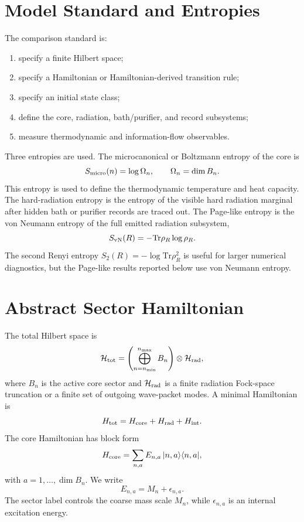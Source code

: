 \documentclass[aps,prd,onecolumn,longbibliography,nofootinbib]{revtex4-2}
\newcommand{\Tr}{\mathrm{Tr}}
\newcommand{\Htot}{\mathcal{H}_{\rm tot}}
\newcommand{\Hrad}{\mathcal{H}_{\rm rad}}
\newcommand{\Svn}{S_{\rm vN}}
\newcommand{\Smicro}{S_{\rm micro}}
\begin{document}
\section{Model Standard and Entropies}
\label{sec:standard}

The comparison standard is:
\begin{enumerate}[leftmargin=*]
    \item specify a finite Hilbert space;
    \item specify a Hamiltonian or Hamiltonian-derived transition rule;
    \item specify an initial state class;
    \item define the core, radiation, bath/purifier, and record subsystems;
    \item measure thermodynamic and information-flow observables.
\end{enumerate}

Three entropies are used.  The microcanonical or Boltzmann entropy of the core
is
\begin{equation}
    \Smicro(n)=\log\Omega_n,\qquad \Omega_n=\dim B_n .
\end{equation}
This entropy is used to define the thermodynamic temperature and heat
capacity.  The hard-radiation entropy is the entropy of the visible hard
radiation marginal after hidden bath or purifier records are traced out.  The
Page-like entropy is the von Neumann entropy of the full emitted radiation
subsystem,
\begin{equation}
    \Svn(R)=-\Tr \rho_R\log\rho_R .
\end{equation}
The second Renyi entropy $S_2(R)=-\log\Tr\rho_R^2$ is useful for larger
numerical diagnostics, but the Page-like results reported below use von
Neumann entropy.

\section{Abstract Sector Hamiltonian}
\label{sec:hamiltonian}

The total Hilbert space is
\begin{equation}
    \Htot=\left(\bigoplus_{n=n_{\min}}^{n_{\max}} B_n\right)\otimes \Hrad ,
\end{equation}
where $B_n$ is the active core sector and $\Hrad$ is a finite radiation
Fock-space truncation or a finite set of outgoing wave-packet modes.  A minimal
Hamiltonian is
\begin{equation}
    H_{\rm tot}=H_{\rm core}+H_{\rm rad}+H_{\rm int}.
\end{equation}
The core Hamiltonian has block form
\begin{equation}
    H_{\rm core}
    =
    \sum_{n,a} E_{n,a}\,
    |n,a\rangle\langle n,a| ,
\end{equation}
with $a=1,\ldots,\dim B_n$.  We write
\begin{equation}
    E_{n,a}=M_n+\epsilon_{n,a}.
\end{equation}
The sector label controls the coarse mass scale $M_n$, while
$\epsilon_{n,a}$ is an internal excitation energy.
\end{document}
